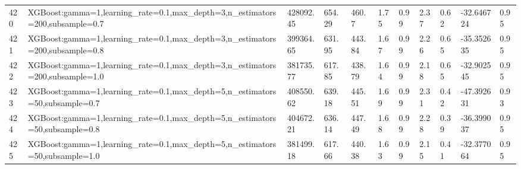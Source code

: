 \begin{longtable}{C{0.8cm} L{2cm} C{1.15cm} C{1.15cm} C{1.15cm} C{1.15cm} C{0.85cm} C{1.25cm} C{1.2cm} C{1.5cm} C{1.0cm}}
420 & XGBoost:\newline gamma=1,\newline learning\_rate=0.1,\newline max\_depth=3,\newline n\_estimators=200,\newline subsample=0.7 & 428092.45 & 654.29 & 460.7 & 1.75 & 0.99 & 2.37 & 0.62 & -32.646724 & 0.95 \\
421 & XGBoost:\newline gamma=1,\newline learning\_rate=0.1,\newline max\_depth=3,\newline n\_estimators=200,\newline subsample=0.8 & 399364.65 & 631.95 & 443.84 & 1.67 & 0.99 & 2.26 & 0.65 & -35.352635 & 0.95 \\
422 & XGBoost:\newline gamma=1,\newline learning\_rate=0.1,\newline max\_depth=3,\newline n\_estimators=200,\newline subsample=1.0 & 381735.77 & 617.85 & 438.79 & 1.64 & 0.99 & 2.18 & 0.65 & -32.902545 & 0.95 \\
423 & XGBoost:\newline gamma=1,\newline learning\_rate=0.1,\newline max\_depth=5,\newline n\_estimators=50,\newline subsample=0.7 & 408550.62 & 639.18 & 445.51 & 1.69 & 0.99 & 2.31 & 0.42 & -47.392631 & 0.93 \\
424 & XGBoost:\newline gamma=1,\newline learning\_rate=0.1,\newline max\_depth=5,\newline n\_estimators=50,\newline subsample=0.8 & 404672.21 & 636.14 & 447.49 & 1.68 & 0.99 & 2.28 & 0.39 & -36.399037 & 0.95 \\
425 & XGBoost:\newline gamma=1,\newline learning\_rate=0.1,\newline max\_depth=5,\newline n\_estimators=50,\newline subsample=1.0 & 381499.18 & 617.66 & 440.38 & 1.63 & 0.99 & 2.15 & 0.41 & -32.377064 & 0.95 \\

\end{longtable}
